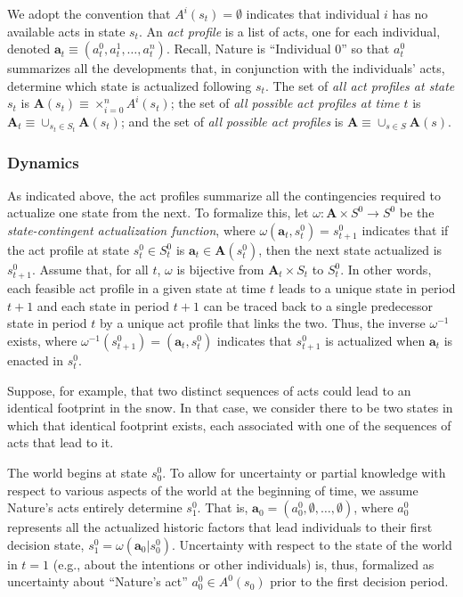 \documentclass[
11pt,
titlepage,
reqno,
]{article}%
\theoremstyle{definition}
\begin{document}
	We adopt the convention that $A^i(s_t)=\emptyset$ indicates that individual $i$ has no available acts in state $s_t$.
	An \textit{act profile} is a list of acts, one for each individual, denoted  $\mathbf{a}_t\equiv(a^0_t,a^1_t,\ldots,a^n_t)$. 
	Recall, Nature is ``Individual 0'' so that $a^0_t$ summarizes all the developments that, in conjunction with the individuals' acts, determine which state is actualized following $s_t$. 
	The set of \textit{all act profiles at state $s_t$} is $\mathbf{A}(s_t)\equiv \times_{i=0}^n A^i(s_t)$; the set of \textit{all possible act profiles at time $t$} is  $\mathbf{A}_t\equiv \cup_{s_t\in S_t} \mathbf{A}(s_t)$; and the set of \textit{all possible act profiles} is $\mathbf{A}\equiv \cup_{s\in S} \mathbf{A}(s)$. 
	
	

	\subsubsection{Dynamics  } 
	  
	As indicated above, the act profiles summarize all the contingencies required to actualize one state from the next. 
	To formalize this, let $\omega:\mathbf{A}\times S^0\rightarrow S^0$ be the \textit{state-contingent actualization function}, where $\omega(\mathbf{a}_t,s^0_t)=s^0_{t+1}$ indicates that if the act profile at state $s^0_t\in S^0_t$ is $\mathbf{a}_t\in \mathbf{A}(s^0_t)$, then the next state actualized is $s^0_{t+1}$.
	Assume that, for all $t$, $\omega$ is bijective from $\mathbf{A}_t\times S_t$ to $S^0_t$.
	In other words, each feasible  act profile in a given state at time $t$ leads to a unique state in period $t+1$ and each state in period $t+1$ can be traced back to a single predecessor state in period $t$ by a unique act profile that links the two.
	Thus, the inverse $\omega^{-1}$ exists, where $\omega^{-1}(s^0_{t+1})=(\mathbf{a}_t,s^0_t)$ indicates that $s^0_{t+1}$ is actualized when $\mathbf{a}_t$ is enacted in $s^0_t$.

	Suppose, for example, that two distinct sequences of acts could lead to an identical footprint in the snow.
	In that case, we consider there to be two states in which that identical footprint exists, each associated with one of the sequences of acts that lead to it. 

	The world begins at state $s_0^0$.
	To allow for uncertainty or partial knowledge with respect to various aspects of the world at the beginning of time, we assume Nature's acts entirely determine $s^0_{1}$. 
	That is, $\mathbf{a}_0=(a^0_0,\emptyset,\ldots,\emptyset)$, where $a^0_0$ represents all the actualized historic factors that lead individuals to their  first decision state, $s^0_1=\omega(\mathbf{a}_0|s^0_0)$.
	Uncertainty with respect to the state of the world in $t=1$ (e.g., about the intentions or other individuals) is, thus, formalized as uncertainty about ``Nature's act'' $a^0_0\in A^0(s_0)$ prior to the first decision period.
	
\end{document}
